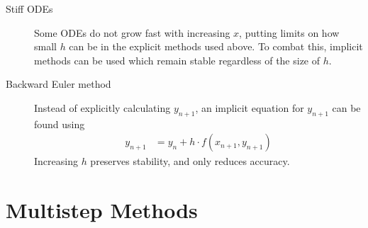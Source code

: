 \begin{description}
    \item[Stiff ODEs] Some ODEs do not grow fast with increasing $ x $, putting limits on
        how small $ h $ can be in the explicit methods used above. To combat this,
        implicit methods can be used which remain stable regardless of the size of $ h $.

    \item[Backward Euler method] Instead of explicitly calculating $ y_{n+1} $, an
        implicit equation for $ y_{n+1} $ can be found using
        \begin{align}
            y_{n+1} & = y_n + h \cdot f(x_{n+1}, y_{n+1})
        \end{align}
        Increasing $ h $ preserves stability, and only reduces accuracy.
\end{description}

\section{Multistep Methods}

